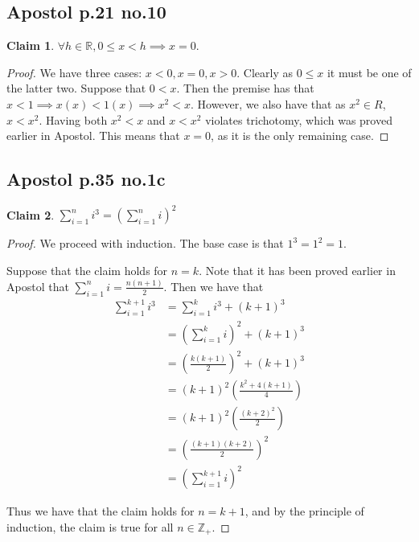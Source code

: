 \documentclass[12pt,letterpaper]{article}
\theoremstyle{definition}
\newtheorem*{claim}{Claim}
\newcommand{\R}{\mathbb{R}}
\newcommand{\Z}{\mathbb{Z}}
\begin{document}
\subsection*{Apostol p.21 no.10}

\begin{claim}
    $\forall h \in \R, 0 \leq x < h \implies x = 0$.
\end{claim}

\begin{proof}
    We have three cases: $x < 0, x = 0, x > 0$.
    Clearly as $0 \leq x$ it must be one of the latter two.
    Suppose that $0 < x$.
    Then the premise has that $x < 1 \implies x(x) < 1(x) \implies x^2 < x$.
    However, we also have that as $x^2 \in R$, $x < x^2$.
    Having both $x^2 < x$ and $x < x^2$ violates trichotomy, which was proved earlier
    in Apostol. This means that $x = 0$, as it is the only remaining case.
\end{proof}

\subsection*{Apostol p.35 no.1c}

\begin{claim}
    $\sum_{i=1}^{n} i^3 = (\sum_{i=1}^{n} i)^2$
\end{claim}

\begin{proof}
    We proceed with induction. The base case is that $1^3 = 1^2 = 1$.

    Suppose that the claim holds for $n = k$.
    Note that it has been proved earlier in Apostol that 
    $\sum_{i=1}^{n} i = \frac{n(n+1)}{2}$.
    Then we have that 
    \begin{align*}
        \sum_{i=1}^{k+1} i^3 &= \sum_{i=1}^{k} i^3 + (k+1)^3 \\
        &= (\sum_{i=1}^{k} i)^2 + (k+1)^3 \\
        &= (\frac{k(k+1)}{2})^2 + (k+1)^3 \\
        &= (k+1)^2(\frac{k^2 + 4(k+1)}{4}) \\
        &= (k+1)^2(\frac{(k+2)^2}{2}) \\
        &= (\frac{(k+1)(k+2)}{2})^2 \\
        &= (\sum_{i=1}^{k+1} i)^2
    \end{align*}

    Thus we have that the claim holds for $n = k+1$, and by the principle of induction,
    the claim is true for all $n \in \Z_+$. 
\end{proof}
\end{document}
